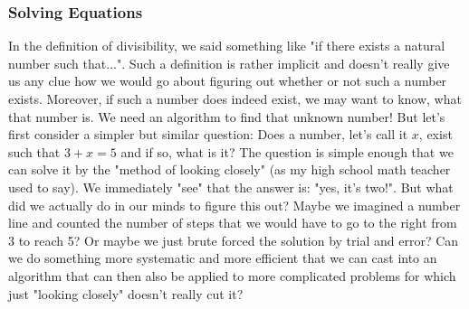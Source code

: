 \subsubsection{Solving Equations}
In the definition of divisibility, we said something like "if there exists a natural number such that...". Such a definition is rather implicit and doesn't really give us any clue how we would go about figuring out whether or not such a number exists. Moreover, if such a number does indeed exist, we may want to know, what that number is. We need an algorithm to find that unknown number! But let's first consider a simpler but similar question: Does a number, let's call it $x$, exist such that $3 + x = 5$ and if so, what is it? The question is simple enough that we can solve it by the "method of looking closely" (as my high school math teacher used to say). We immediately "see" that the answer is: "yes, it's two!". But what did we actually do in our minds to figure this out? Maybe we imagined a number line and counted the number of steps that we would have to go to the right from 3 to reach 5? Or maybe we just brute forced the solution by trial and error? Can we do something more systematic and more efficient that we can cast into an algorithm that can then also be applied to more complicated problems for which just "looking closely" doesn't really cut it? 

